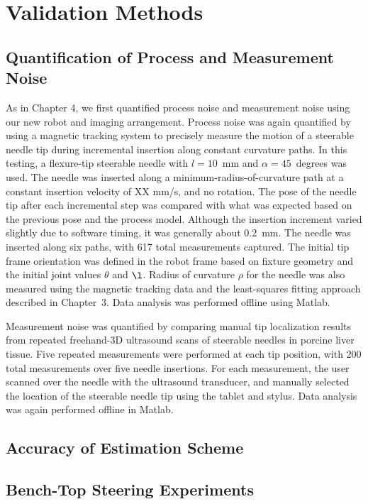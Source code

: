 \section{Validation Methods}
\label{sec:HumanInTheLoopValidation}

\subsection{Quantification of Process and Measurement Noise}
As in Chapter 4, we first quantified process noise and measurement noise using our new robot and imaging arrangement. Process noise was again quantified by using a magnetic tracking system to precisely measure the motion of a steerable needle tip during incremental insertion along constant curvature paths. In this testing, a flexure-tip steerable needle with $l = 10$~mm and $\alpha = 45$~degrees was used. The needle was inserted along a minimum-radius-of-curvature path at a constant insertion velocity of XX mm/s, and no rotation. The pose of the needle tip after each incremental step was compared with what was expected based on the previous pose and the process model. Although the insertion increment varied slightly due to software timing, it was generally about 0.2~mm. The needle was inserted along six paths, with 617 total measurements captured. The initial tip frame orientation was defined in the robot frame based on fixture geometry and the initial joint values $\theta$ and $\l$. Radius of curvature $\rho$ for the needle was also measured using the magnetic tracking data and the least-squares fitting approach described in Chapter~3. Data analysis was performed offline using Matlab. 

Measurement noise was quantified by comparing manual tip localization results from repeated freehand-3D ultrasound scans of steerable needles in porcine liver tissue. Five repeated measurements were performed at each tip position, with 200 total measurements over five needle insertions. For each measurement, the user scanned over the needle with the ultrasound transducer, and manually selected the location of the steerable needle tip using the tablet and stylus. Data analysis was again performed offline in Matlab.

\subsection{Accuracy of Estimation Scheme}

\subsection{Bench-Top Steering Experiments}

